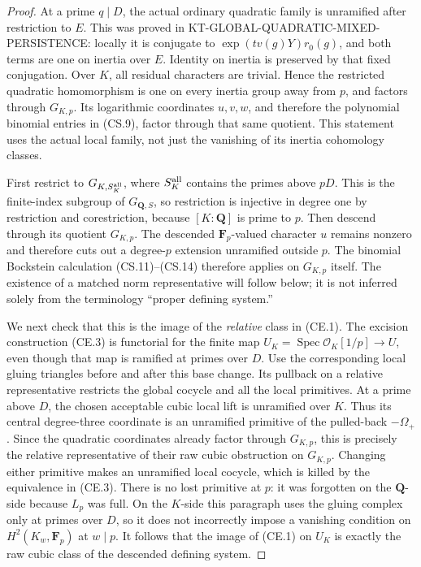 \begin{proof}
At a prime \(q\mid D\), the actual ordinary quadratic family
is unramified after restriction to \(E\).  This was proved in
KT-GLOBAL-QUADRATIC-MIXED-PERSISTENCE: locally it is conjugate to
\(\exp(t v(g)Y)r_0(g)\), and both terms are one on inertia
over \(E\).  Identity on inertia is preserved by that fixed
conjugation.  Over \(K\), all residual characters are trivial.
Hence the restricted quadratic homomorphism is one on every
inertia group away from \(p\), and factors through \(G_{K,p}\).
Its logarithmic coordinates \(u,v,w\), and therefore the
polynomial binomial entries in (CS.9), factor through that
same quotient.  This statement uses the actual local family,
not just the vanishing of its inertia cohomology classes.

First restrict to \(G_{K,S_K^{\rm all}}\), where
\(S_K^{\rm all}\) contains the primes above \(pD\).
This is the finite-index subgroup of \(G_{\mathbf Q,S}\),
so restriction is injective in degree one by restriction
and corestriction, because \([K:\mathbf Q]\) is prime to \(p\).
Then descend through its quotient \(G_{K,p}\).
The descended \(\mathbf F_p\)-valued
character \(u\) remains nonzero and therefore cuts out
a degree-\(p\) extension unramified outside \(p\).
The binomial Bockstein calculation (CS.11)--(CS.14)
therefore applies on \(G_{K,p}\) itself.  The existence
of a matched norm representative will follow below;
it is not inferred solely from the terminology
``proper defining system.''

We next check that this is the image of the \emph{relative}
class in (CE.1).  The excision construction (CE.3) is functorial
for the finite map
\(U_K=\operatorname{Spec}\mathcal O_K[1/p]\to U\),
even though that map is ramified at primes over \(D\).
Use the corresponding local gluing triangles before and after
this base change.  Its pullback on a relative representative
restricts the global cocycle and all the local primitives.
At a prime above \(D\), the chosen acceptable cubic local
lift is unramified over \(K\).  Thus its central degree-three
coordinate is an unramified primitive of the pulled-back
\(-\Omega_+\).  Since the quadratic coordinates already
factor through \(G_{K,p}\), this is precisely the relative
representative of their raw cubic obstruction on \(G_{K,p}\).
Changing either primitive makes an unramified local cocycle,
which is killed by the equivalence in (CE.3).
There is no lost primitive at \(p\): it was forgotten on the
\(\mathbf Q\)-side because \(L_p\) was full.  On the
\(K\)-side this paragraph uses the gluing complex only at
primes over \(D\), so it does not incorrectly impose a
vanishing condition on \(H^2(K_w,\mathbf F_p)\) at \(w\mid p\).
It follows that the image of (CE.1) on \(U_K\) is exactly
the raw cubic class of the descended defining system.


\end{proof}
